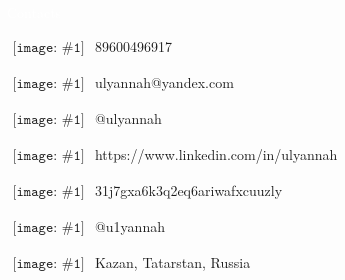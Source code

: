 
\newcommand{\ContactEntry}[2]{
	$\begin{array}{l}
	{\texttt{[image: \#1]}}
	\end{array}
	$ #2
}


\LARGE
\noindent\colorbox{materialGreen}
{\parbox[c][25pt][c]{\textwidth}{\hspace{15pt}\textcolor{white}{Contacts}}} %

\begin{multicols}{2}

\large
\ContactEntry{images/green/telephonenew}{89600496917}

\ContactEntry{images/green/mailnew}{ulyannah@yandex.com}

\ContactEntry{images/green/socialnewins}{@ulyannah}

\ContactEntry{images/green/linkedinnew}{https://www.linkedin.com/in/ulyannah}

\columnbreak
\ContactEntry{images/green/socialnew}{31j7gxa6k3q2eq6ariwafxcuuzly}

\ContactEntry{images/green/socialnewtw}{@u1yannah}

\ContactEntry{images/green/housenew}{Kazan, Tatarstan, Russia}



\end{multicols}
